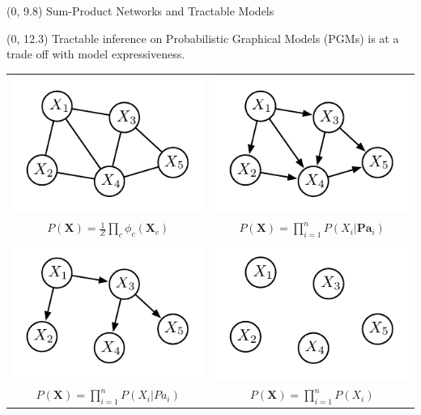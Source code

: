 \documentclass[final]{beamer}
\begin{document}
\begin{frame}{}
  
  \begin{textblock}{80}(0, 9.8)
    Sum-Product Networks and Tractable Models
  \end{textblock}
  
  
  \begin{textblock}{25.7}(0, 12.3)
    \small
    Tractable inference on Probabilistic Graphical Models (PGMs) is
    at a trade off with model expressiveness.
    \begin{table}[!ht]
      \setlength{\tabcolsep}{35pt}
      \centering
      \begin{tabular}{c c}
        
        \includegraphics[width=0.25\linewidth]{figures/mrf} &
                                                              \includegraphics[width=0.25\linewidth]{figures/bn}\\
        \addlinespace[-0.2cm]
        \scriptsize  $P(\mathbf{X})=\frac{1}{Z}\prod_{c}\phi_{c}(\mathbf{X}_{c})$
                                                            & 
                                                              \scriptsize
                                                              $P(\mathbf{X})=\prod_{i=1}^nP(X_{i}|\mathbf{Pa}_{i})$\\
        \addlinespace[0.5cm]
        \includegraphics[width=0.25\linewidth]{figures/clt} &
                                                              \includegraphics[width=0.25\linewidth]{figures/nf}\\
        \addlinespace[-0.2cm]
        \scriptsize
        $P(\mathbf{X})=\prod_{i=1}^nP(X_{i}|Pa_{i})$ &
                                                       \scriptsize $P(\mathbf{X})=\prod_{i=1}^nP(X_{i})$                                                              
      \end{tabular}
    \end{table}
    

\end{textblock}
\end{frame}
\end{document}

